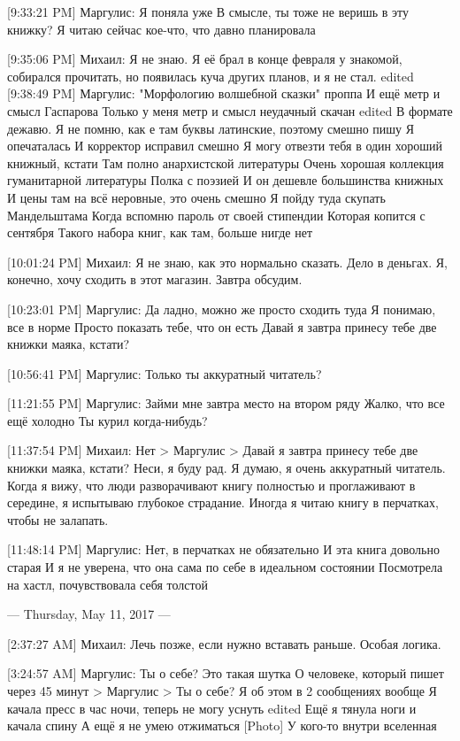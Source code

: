 \documentclass{article}
\begin{document}
[9:33:21 PM] Маргулис:
Я поняла уже
 В смысле, ты тоже не веришь в эту книжку?
 Я читаю сейчас кое-что, что давно планировала

[9:35:06 PM] Михаил:
Я не знаю. Я её брал в конце февраля у знакомой, собирался прочитать, но появилась куча других планов, и я не стал.
edited 
[9:38:49 PM] Маргулис:
"Морфологию волшебной сказки" проппа
 И ещё метр и смысл Гаспарова
 Только у меня метр и смысл неудачный скачан
edited 
В формате дежавю. Я не помню, как е там буквы латинские, поэтому смешно пишу
 Я опечаталась
 И корректор исправил смешно
 Я могу отвезти тебя в один хороший книжный, кстати
 Там полно анархистской литературы
 Очень хорошая коллекция гуманитарной литературы
 Полка с поэзией
 И он дешевле большинства книжных
 И цены там на всё неровные, это очень смешно
 Я пойду туда скупать Мандельштама
 Когда вспомню пароль от своей стипендии
 Которая копится с сентября
 Такого набора книг, как там, больше нигде нет

[10:01:24 PM] Михаил:
Я не знаю, как это нормально сказать. Дело в деньгах.
 Я, конечно, хочу сходить в этот магазин.
 Завтра обсудим.

[10:23:01 PM] Маргулис:
Да ладно, можно же просто сходить туда
 Я понимаю, все в норме
 Просто показать тебе, что он есть
 Давай я завтра принесу тебе две книжки маяка, кстати?

[10:56:41 PM] Маргулис:
Только ты аккуратный читатель?

[11:21:55 PM] Маргулис:
Займи мне завтра место на втором ряду
 Жалко, что все ещё холодно
 Ты курил когда-нибудь?

[11:37:54 PM] Михаил:
Нет
> Маргулис
> Давай я завтра принесу тебе две книжки маяка, кстати?
Неси, я буду рад. Я думаю, я очень аккуратный читатель. Когда я вижу, что люди разворачивают книгу полностью и проглаживают в середине, я испытываю глубокое страдание. Иногда я читаю книгу в перчатках, чтобы не залапать.

[11:48:14 PM] Маргулис:
Нет, в перчатках не обязательно
 И эта книга довольно старая
 И я не уверена, что она сама по себе в идеальном состоянии
 Посмотрела на хастл, почувствовала себя толстой

--- Thursday, May 11, 2017 ---

[2:37:27 AM] Михаил:
Лечь позже, если нужно вставать раньше. Особая логика.

[3:24:57 AM] Маргулис:
Ты о себе?
 Это такая шутка
 О человеке, который пишет через 45 минут
> Маргулис
> Ты о себе?
Я об этом в 2 сообщениях вообще
 Я качала пресс в час ночи, теперь не могу уснуть
edited 
Ещё я тянула ноги и качала спину
 А ещё я не умею отжиматься
 [Photo]
 У кого-то внутри вселенная
\end{document}
